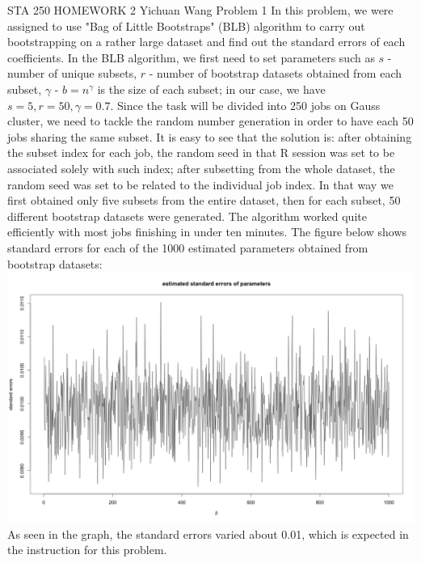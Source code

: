 \documentclass[12pt]{article}
\begin{document}
\noindent STA 250 HOMEWORK 2 \newline Yichuan Wang \newline \newline
Problem 1 \newline \newline
In this problem, we were assigned to use "Bag of Little Bootstraps" (BLB) algorithm to carry out bootstrapping on a rather large dataset and find out the standard errors of each coefficients. \newline
In the BLB algorithm, we first need to set parameters such as $s$ - number of unique subsets, $r$ - number of bootstrap datasets obtained from each subset, $\gamma$ - $b = n^\gamma$ is the size of each subset; in our case, we have $s = 5, r = 50, \gamma = 0.7$. Since the task will be divided into 250 jobs on Gauss cluster, we need to tackle the random number generation in order to have each 50 jobs sharing the same subset. It is easy to see that the solution is: after obtaining the subset index for each job, the random seed in that R session was set to be associated solely with such index; after subsetting from the whole dataset, the random seed was set to be related to the individual job index. In that way we first obtained only five subsets from the entire dataset, then for each subset, 50 different bootstrap datasets were generated. The algorithm worked quite efficiently with most jobs finishing in under ten minutes. The figure below shows standard errors for each of the 1000 estimated parameters obtained from bootstrap datasets: \newline
\includegraphics[width=\textwidth]{seplot.png} \newline
As seen in the graph, the standard errors varied about 0.01, which is expected in the instruction for this problem. \newline \newline
\end{document}
